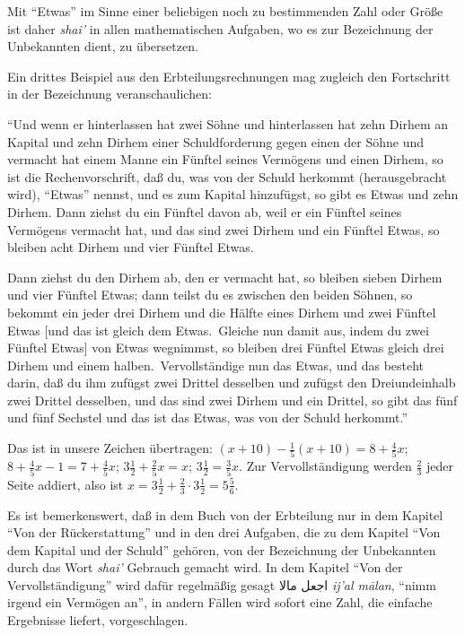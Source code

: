 \documentclass[11pt,a4paper]{article}
\newcommand{\RL}[1]{\beginR#1\endR}
\newcommand{\ar}[1]{{\arabicfont\RL{#1}}}
\newcommand{\enquote}[1]{``#1''}
\begin{document}
Mit \enquote{Etwas} im Sinne einer beliebigen noch zu bestimmenden Zahl oder Gr\"o\ss{}e ist daher \textit{shai'} in allen mathematischen Aufgaben, wo es zur Bezeichnung der Unbekannten dient, zu \"ubersetzen.

Ein drittes Beispiel aus den Erbteilungsrechnungen mag zugleich den Fortschritt in der Bezeichnung veranschaulichen:

\enquote{Und wenn er hinterlassen hat zwei S\"ohne und hinterlassen hat zehn Dirhem an Kapital und zehn Dirhem einer Schuldforderung gegen einen der S\"ohne und vermacht hat einem Manne ein F\"unftel seines Verm\"ogens und einen Dirhem, so ist die Rechenvorschrift, da\ss{} du, was von der Schuld herkommt (herausgebracht wird), \enquote{Etwas} nennst, und es zum Kapital hinzuf\"ugst, so gibt es Etwas und zehn Dirhem. Dann ziehst du ein F\"unftel davon ab, weil er ein F\"unftel seines Verm\"ogens vermacht hat, und das sind zwei Dirhem und ein F\"unftel Etwas, so bleiben acht Dirhem und vier F\"unftel Etwas.

Dann ziehst du den Dirhem ab, den er vermacht hat, so bleiben sieben Dirhem und vier F\"unftel Etwas; dann teilst du es zwischen den beiden S\"ohnen, so bekommt ein jeder drei Dirhem und die H\"alfte eines Dirhem und zwei F\"unftel Etwas [und das ist gleich dem Etwas.\ Gleiche nun damit aus, indem du zwei F\"unftel Etwas] von Etwas wegnimmst, so bleiben drei F\"unftel Etwas gleich drei Dirhem und einem halben.\ Vervollst\"andige nun das Etwas, und das besteht darin, da\ss{} du ihm zuf\"ugst zwei Drittel desselben und zuf\"ugst den Dreiundeinhalb zwei Drittel desselben, und das sind zwei Dirhem und ein Drittel, so gibt das f\"unf und f\"unf Sechstel und das ist das Etwas, was von der Schuld herkommt.}

Das ist in unsere Zeichen \"ubertragen: $(x + 10) - \frac{1}{5}(x + 10) = 8 + \frac{4}{5}x$; $8 + \frac{4}{5}x - 1 = 7 + \frac{4}{5}x$; $3\frac{1}{2} + \frac{2}{5}x = x$; $3\frac{1}{2} = \frac{3}{5}x$. Zur Vervollst\"andigung werden $\frac{2}{3}$ jeder Seite addiert, also ist $x = 3\frac{1}{2} + \frac{2}{3} \cdot 3\frac{1}{2} = 5\frac{5}{6}$.

Es ist bemerkenswert, da\ss{} in dem Buch von der Erbteilung nur in dem Kapitel \enquote{Von der R\"uckerstattung} und in den drei Aufgaben, die zu dem Kapitel \enquote{Von dem Kapital und der Schuld} geh\"oren, von der Bezeichnung der Unbekannten durch das Wort \textit{shai'} Gebrauch gemacht wird. In dem Kapitel \enquote{Von der Vervollst\"andigung} wird daf\"ur regelm\"a\ss{}ig gesagt \ar{اجعل مالا} \textit{ij'al m\=alan}, \enquote{nimm irgend ein Verm\"ogen an}, in andern F\"allen wird sofort eine Zahl, die einfache Ergebnisse liefert, vorgeschlagen.
\end{document}
